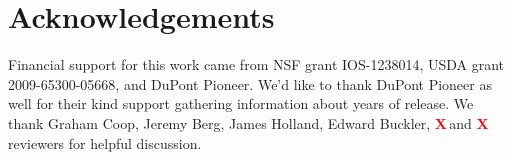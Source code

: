\documentclass[9pt,twocolumn,twoside]{gsajnl}
\newcommand{\X}{\textcolor{red}{\bf X\,}}
\begin{document}
\section*{Acknowledgements}
Financial support for this work came from NSF grant IOS-1238014, USDA grant 2009-65300-05668, and DuPont Pioneer.  We'd like to thank DuPont Pioneer as well for their kind support gathering information about years of release. We thank Graham Coop, Jeremy Berg, James Holland, Edward Buckler, \X and \X reviewers for helpful discussion. 


\end{document}
